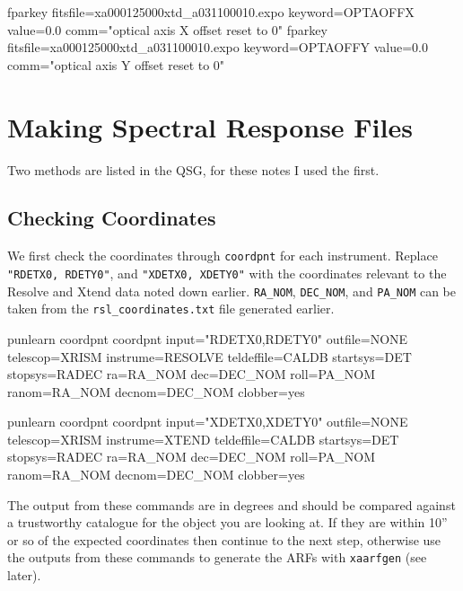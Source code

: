 \documentclass[
  letterpaper,
  DIV=11,
  numbers=noendperiod]{scrreprt}
\newenvironment{Shaded}{\begin{snugshade}}{\end{snugshade}}
\newcommand{\ExtensionTok}[1]{\textcolor[rgb]{0.00,0.23,0.31}{#1}}
\newcommand{\NormalTok}[1]{\textcolor[rgb]{0.00,0.23,0.31}{#1}}
\newcommand{\StringTok}[1]{\textcolor[rgb]{0.13,0.47,0.30}{#1}}
\begin{document}
\begin{Shaded}
\begin{Highlighting}[]
\ExtensionTok{fparkey}\NormalTok{ fitsfile=xa000125000xtd\_a031100010.expo keyword=OPTAOFFX value=0.0 comm=}\StringTok{"optical axis X offset reset to 0"}
\ExtensionTok{fparkey}\NormalTok{ fitsfile=xa000125000xtd\_a031100010.expo keyword=OPTAOFFY value=0.0 comm=}\StringTok{"optical axis Y offset reset to 0"}
\end{Highlighting}
\end{Shaded}

\section{Making Spectral Response
Files}\label{making-spectral-response-files}

Two methods are listed in the QSG, for these notes I used the first.

\subsection{Checking Coordinates}\label{checking-coordinates}

We first check the coordinates through \texttt{coordpnt} for each
instrument. Replace \texttt{"RDETX0,\ RDETY0"}, and
\texttt{"XDETX0,\ XDETY0"} with the coordinates relevant to the Resolve
and Xtend data noted down earlier. \texttt{RA\_NOM}, \texttt{DEC\_NOM},
and \texttt{PA\_NOM} can be taken from the \texttt{rsl\_coordinates.txt}
file generated earlier.

\begin{Shaded}
\begin{Highlighting}[]
\ExtensionTok{punlearn}\NormalTok{ coordpnt}
\ExtensionTok{coordpnt}\NormalTok{ input=}\StringTok{"RDETX0,RDETY0"}\NormalTok{ outfile=NONE telescop=XRISM instrume=RESOLVE teldeffile=CALDB startsys=DET stopsys=RADEC ra=RA\_NOM dec=DEC\_NOM roll=PA\_NOM ranom=RA\_NOM decnom=DEC\_NOM clobber=yes}

\ExtensionTok{punlearn}\NormalTok{ coordpnt}
\ExtensionTok{coordpnt}\NormalTok{ input=}\StringTok{"XDETX0,XDETY0"}\NormalTok{ outfile=NONE telescop=XRISM instrume=XTEND teldeffile=CALDB startsys=DET stopsys=RADEC ra=RA\_NOM dec=DEC\_NOM roll=PA\_NOM ranom=RA\_NOM decnom=DEC\_NOM clobber=yes}
\end{Highlighting}
\end{Shaded}

The output from these commands are in degrees and should be compared
against a trustworthy catalogue for the object you are looking at. If
they are within 10'' or so of the expected coordinates then continue to
the next step, otherwise use the outputs from these commands to generate
the ARFs with \texttt{xaarfgen} (see later).
\end{document}
